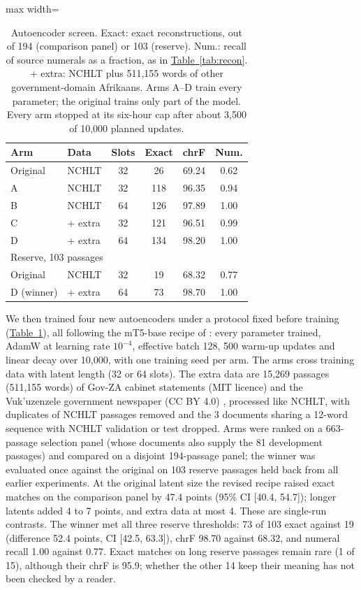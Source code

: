 \documentclass[11pt,a4paper]{article}
\begin{document}
\begin{table}[t]
\centering
\small
\setlength{\tabcolsep}{4pt}
\begin{adjustbox}{max width=\columnwidth}
\begin{tabular}{llcccc}
\toprule
Arm & Data & Slots & Exact & chrF & Num. \\
\midrule
Original & NCHLT & 32 & 26 & 69.24 & 0.62 \\
A & NCHLT & 32 & 118 & 96.35 & 0.94 \\
B & NCHLT & 64 & 126 & 97.89 & 1.00 \\
C & + extra & 32 & 121 & 96.51 & 0.99 \\
D & + extra & 64 & 134 & 98.20 & 1.00 \\
\midrule
\multicolumn{6}{l}{Reserve, 103 passages} \\
Original & NCHLT & 32 & 19 & 68.32 & 0.77 \\
D (winner) & + extra & 64 & 73 & 98.70 & 1.00 \\
\bottomrule
\end{tabular}
\end{adjustbox}
\caption{Autoencoder screen. Exact: exact reconstructions, out of 194 (comparison panel) or 103 (reserve). Num.: recall of source numerals as a fraction, as in \hyperref[tab:recon]{Table~\ref*{tab:recon}}. + extra: NCHLT plus 511,155 words of other government-domain Afrikaans. Arms A--D train every parameter; the original trains only part of the model. Every arm stopped at its six-hour cap after about 3,500 of 10,000 planned updates.}
\label{tab:aescreen}
\end{table}

We then trained four new autoencoders under a protocol fixed before training (\hyperref[tab:aescreen]{Table~\ref*{tab:aescreen}}), all following the mT5-base recipe of \citet{lovelace2023latent}: every parameter trained, AdamW \citep{loshchilov2019decoupled} at learning rate $10^{-4}$, effective batch 128, 500 warm-up updates and linear decay over 10,000, with one training seed per arm. The arms cross training data with latent length (32 or 64 slots). The extra data are 15,269 passages (511,155 words) of Gov-ZA cabinet statements (MIT licence) and the Vuk'uzenzele government newspaper (CC BY 4.0) \citep{lastrucci2023preparing}, processed like NCHLT, with duplicates of NCHLT passages removed and the 3 documents sharing a 12-word sequence with NCHLT validation or test dropped. Arms were ranked on a 663-passage selection panel (whose documents also supply the 81 development passages) and compared on a disjoint 194-passage panel; the winner was evaluated once against the original on 103 reserve passages held back from all earlier experiments. At the original latent size the revised recipe raised exact matches on the comparison panel by 47.4 points (95\% CI [40.4, 54.7]); longer latents added 4 to 7 points, and extra data at most 4. These are single-run contrasts. The winner met all three reserve thresholds: 73 of 103 exact against 19 (difference 52.4 points, CI [42.5, 63.3]), chrF 98.70 against 68.32, and numeral recall 1.00 against 0.77. Exact matches on long reserve passages remain rare (1 of 15), although their chrF is 95.9; whether the other 14 keep their meaning has not been checked by a reader.
\end{document}
